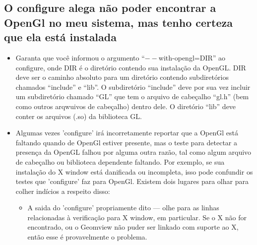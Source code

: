 \documentclass[12pt,a4paper]{article}
\begin{document}
    \subsection{O configure alega n\~ao poder encontrar a OpenGl no meu sistema, mas tenho certeza que ela est\'a instalada}
    \label{aswer:OpenGl}
        \begin{itemize}
          \item Garanta que voc\^e informou o argumento ``$--$with-opengl=DIR'' ao configure,
            onde DIR \'e o diret\'{o}rio contendo sua instala\c{c}\~ao da OpenGL. DIR
            deve ser o caminho absoluto para um diret\'{o}rio contendo subdiret\'{o}rios
            chamados ``include'' e ``lib''. O subdiret\'{o}rio ``include'' deve por sua vez
            incluir um subdiret\'{o}rio chamado ``GL'' que tem o arquivo de cabe\c{c}alho ``gl.h'' (bem
            como outros arqwuivos de cabe\c{c}alho) dentro dele. O diret\'{o}rio ``lib'' deve
            conter os arquivos (.so) da biblioteca GL.

          \item Algumas vezes 'configure' ir\'a incorretamente reportar que a OpenGl est\'a faltando
            quando de OpenGl estiver presente, mas o teste para detectar a presen\c{c}a da OpenGL falhou por alguma
            outra raz\~ao, tal como algum arquivo de cabe\c{c}alho ou biblioteca dependente faltando.
            Por exemplo, se sua instala\c{c}\~ao do X window est\'a danificada ou
            incompleta, isso pode confundir os testes que 'configure' faz para
            OpenGl. Existem dois lugares para olhar para colher ind\'icios a respeito disso:
              \begin{itemize}
              \item A saida do 'configure' propriamente dito --- olhe para as linhas relacionadas
                \`a verifica\c{c}\~ao para X window, em particular. Se o X n\~ao for encontrado, ou
                o Geomview n\~ao puder ser linkado com suporte ao X, ent\~ao esse \'e provavelmente o problema.


\end{itemize}
\end{itemize}
\end{document}
